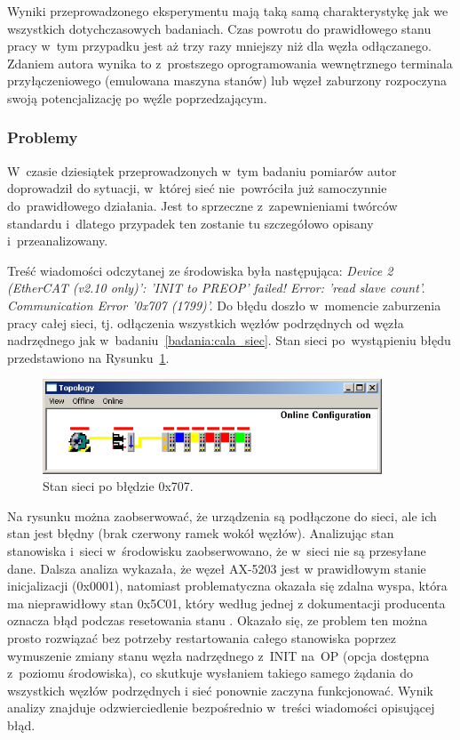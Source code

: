Wyniki przeprowadzonego eksperymentu mają taką samą charakterystykę jak we wszystkich dotychczasowych badaniach. Czas powrotu do prawidłowego stanu pracy w~tym przypadku jest aż trzy razy mniejszy niż dla węzła odłączanego. Zdaniem autora wynika to z~prostszego oprogramowania wewnętrznego terminala przyłączeniowego (emulowana maszyna stanów) lub węzeł zaburzony rozpoczyna swoją potencjalizację po węźle poprzedzającym.

\subsubsection{Problemy}
W~czasie dziesiątek przeprowadzonych w~tym badaniu pomiarów autor doprowadził do sytuacji, w~której sieć nie~powróciła już samoczynnie do~prawidłowego działania. Jest to sprzeczne z~zapewnieniami twórców standardu i~dlatego przypadek ten zostanie tu szczegółowo opisany i~przeanalizowany.

Treść wiadomości odczytanej ze środowiska była następująca: \textit{Device 2 (EtherCAT (v2.10 only)': 'INIT to PREOP' failed! Error: 'read slave count'. Communication Error '0x707 (1799)'.}
Do błędu doszło w~momencie zaburzenia pracy całej sieci, tj. odłączenia wszystkich węzłów podrzędnych od węzła nadrzędnego jak w~badaniu~\ref{badania:cala_siec}. Stan sieci po~wystąpieniu błędu przedstawiono na Rysunku~\ref{err0x707}.
\begin{figure}[!htb] 	\centering 	\includegraphics[width=0.9\textwidth]{images/err0x707} \caption{Stan sieci po błędzie 0x707.} \label{err0x707} \end{figure}

Na rysunku można zaobserwować, że urządzenia są podłączone do sieci, ale ich stan jest błędny (brak czerwony ramek wokół węzłów). Analizując stan stanowiska i~sieci w~środowisku zaobserwowano, że w~sieci nie są przesyłane dane.
Dalsza analiza wykazała, że węzeł AX-5203 jest w prawidłowym stanie inicjalizacji (0x0001), natomiast problematyczna okazała się zdalna wyspa, która ma nieprawidłowy stan 0x5C01, który według jednej z dokumentacji producenta oznacza błąd podczas resetowania stanu \cite{err0x707}.
Okazało się, ze problem ten można prosto rozwiązać bez potrzeby restartowania całego stanowiska poprzez wymuszenie zmiany stanu węzła nadrzędnego z~INIT na~OP (opcja dostępna z~poziomu środowiska), co skutkuje wysłaniem takiego samego żądania do wszystkich węzłów podrzędnych i sieć ponownie zaczyna funkcjonować. Wynik analizy znajduje odzwierciedlenie bezpośrednio w~treści wiadomości opisującej błąd.

